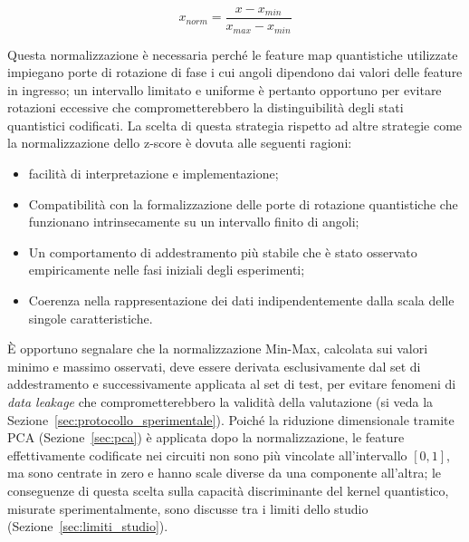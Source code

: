 \begin{equation}
x_{norm} = \frac{x - x_{min}}{x_{max} - x_{min}}
\end{equation}

Questa normalizzazione è necessaria perché le feature map quantistiche utilizzate impiegano porte di rotazione di fase i cui angoli dipendono dai valori delle feature in ingresso; un intervallo limitato e uniforme è pertanto opportuno per evitare rotazioni eccessive che comprometterebbero la distinguibilità degli stati quantistici codificati.
La scelta di questa strategia rispetto ad altre strategie come la normalizzazione dello z-score è dovuta alle seguenti ragioni:

\begin{itemize}
    \item facilità di interpretazione e implementazione;
    \item Compatibilità con la formalizzazione delle porte di rotazione quantistiche che funzionano intrinsecamente su un intervallo finito di angoli;
    \item Un comportamento di addestramento più stabile che è stato osservato empiricamente nelle fasi iniziali degli esperimenti;
    \item Coerenza nella rappresentazione dei dati indipendentemente dalla scala delle singole caratteristiche.
\end{itemize}

È opportuno segnalare che la normalizzazione Min-Max, calcolata sui valori minimo e massimo osservati, deve essere derivata esclusivamente dal set di addestramento e successivamente applicata al set di test, per evitare fenomeni di \textit{data leakage} che comprometterebbero la validità della valutazione (si veda la Sezione~\ref{sec:protocollo_sperimentale}). Poiché la riduzione dimensionale tramite PCA (Sezione~\ref{sec:pca}) è applicata dopo la normalizzazione, le feature effettivamente codificate nei circuiti non sono più vincolate all'intervallo $[0, 1]$, ma sono centrate in zero e hanno scale diverse da una componente all'altra; le conseguenze di questa scelta sulla capacità discriminante del kernel quantistico, misurate sperimentalmente, sono discusse tra i limiti dello studio (Sezione~\ref{sec:limiti_studio}).


